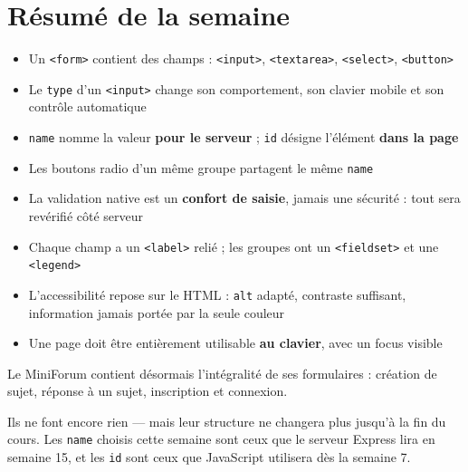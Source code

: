 \documentclass[a4paper,11pt]{article}
\begin{document}
\section*{Résumé de la semaine}

\begin{tcolorbox}[definition, title={Ce qu'il faut retenir}]
\begin{itemize}
  \item Un \texttt{<form>} contient des champs : \texttt{<input>}, \texttt{<textarea>}, \texttt{<select>}, \texttt{<button>}
  \item Le \texttt{type} d'un \texttt{<input>} change son comportement, son clavier mobile et son contrôle automatique
  \item \texttt{name} nomme la valeur \textbf{pour le serveur} ; \texttt{id} désigne l'élément \textbf{dans la page}
  \item Les boutons radio d'un même groupe partagent le même \texttt{name}
  \item La validation native est un \textbf{confort de saisie}, jamais une sécurité : tout sera revérifié côté serveur
  \item Chaque champ a un \texttt{<label>} relié ; les groupes ont un \texttt{<fieldset>} et une \texttt{<legend>}
  \item L'accessibilité repose sur le HTML : \texttt{alt} adapté, contraste suffisant, information jamais portée par la seule couleur
  \item Une page doit être entièrement utilisable \textbf{au clavier}, avec un focus visible
\end{itemize}
\end{tcolorbox}

\vspace{8pt}
\begin{tcolorbox}[filrouge, title={Fil rouge --- MiniForum : tous les formulaires en place}]
Le MiniForum contient désormais l'intégralité de ses formulaires : création de sujet, réponse à un sujet, inscription et connexion.

\vspace{4pt}
Ils ne font encore rien --- mais leur structure ne changera plus jusqu'à la fin du cours. Les \texttt{name} choisis cette semaine sont ceux que le serveur Express lira en semaine 15, et les \texttt{id} sont ceux que JavaScript utilisera dès la semaine 7.
\end{tcolorbox}
\end{document}
